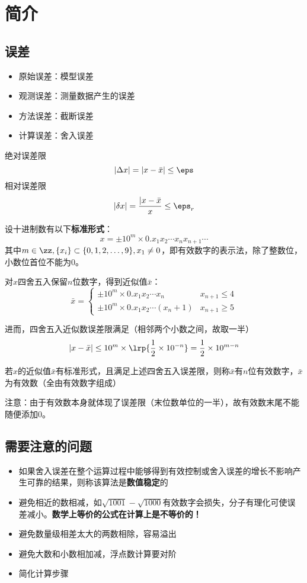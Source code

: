 
\section{简介}
\subsection{误差}
\begin{itemize}
	\item 原始误差：模型误差
	\item 观测误差：测量数据产生的误差
	\item 方法误差：截断误差
	\item 计算误差：舍入误差
\end{itemize}

\begin{definition}[误差限]
	绝对误差限
	\[|\Delta x|=|x-\bar{x}|\leq\eps\]
	相对误差限
	\[|\delta x|=\frac{|x-\bar{x}}{x}\leq \eps_r\]
\end{definition}

设十进制数有以下\textbf{标准形式}：
\[x=\pm 10^m\times 0.x_1 x_2\cdots x_n x_{n+1}\cdots\]
其中$m\in\zz,\{x_i\}\subset\{0,1,2,\ldots,9\},x_1\ne 0$，即有效数字的表示法，除了整数位，小数位首位不能为$0$。

对$x$四舍五入保留$n$位数字，得到近似值$\bar{x}$：
\[\bar{x}=\begin{cases}
	\pm 10^m\times 0.x_1 x_2\cdots x_n & x_{n+1}\leq 4\\
	\pm 10^m\times 0.x_1 x_2\cdots (x_n+1) & x_{n+1}\geq 5
\end{cases}\]

进而，四舍五入近似数误差限满足（相邻两个小数之间，故取一半）
\[|x-\bar{x}|\leq 10^m\times\lrp{\frac{1}{2}\times 10^{-n}}=\frac{1}{2}\times 10^{m-n}\]

\begin{definition}[有效数字]
	若$x$的近似值$\bar{x}$有标准形式，且满足上述四舍五入误差限，则称$\bar{x}$有$n$位有效数字，$\bar{x}$为有效数（全由有效数字组成）
\end{definition}
注意：由于有效数本身就体现了误差限（末位数单位的一半），故有效数末尾不能随便添加$0$。

\subsection{需要注意的问题}
\begin{itemize}
	\item 如果舍入误差在整个运算过程中能够得到有效控制或舍入误差的增长不影响产生可靠的结果，则称该算法是\textbf{数值稳定}的
	\item 避免相近的数相减，如$\sqrt{1001}-\sqrt{1000}$有效数字会损失，分子有理化可使误差减小。\textbf{数学上等价的公式在计算上是不等价的！}
	\item 避免数量级相差太大的两数相除，容易溢出
	\item 避免大数和小数相加减，浮点数计算要对阶
	\item 简化计算步骤
\end{itemize}